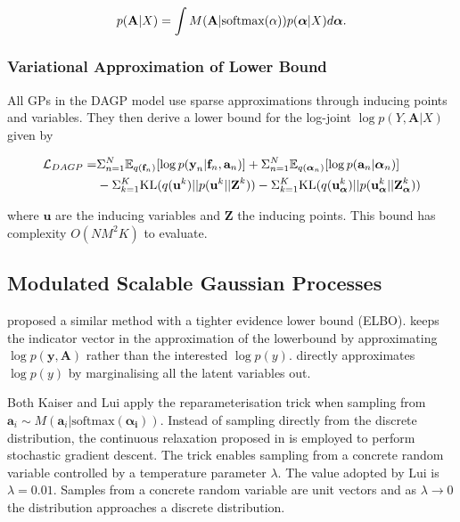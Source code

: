 \documentclass[12pt,a4paper]{report}
\theoremstyle{definition}
\begin{document}
\begin{equation}
	\centering 
	p(\textbf{A} | X) = \int M(\textbf{A} | \textrm{softmax}({\alpha})) p(\boldsymbol{\alpha} | X) d\boldsymbol{\alpha}.
\end{equation}

\subsubsection{Variational Approximation of Lower Bound}

All GPs in the DAGP model use sparse approximations through inducing points and variables.
They then derive a lower bound for the log-joint $\log p(Y, \textbf{A} | X)$ given by

\begin{equation}
	\begin{aligned}
		\centering
		\mathcal{L}_{DAGP} = &\Sigma_{n=1}^{N} \mathbb{E}_{q(\textbf{f}_{n})} [\log p(\textbf{y}_{n} | \textbf{f}_{n}, \textbf{a}_{n})]  + \Sigma_{n=1}^{N} \mathbb{E}_{q(\boldsymbol{\alpha}_{n})} [\log p(\textbf{a}_{n} | \boldsymbol{\alpha}_{n})]  \\
		&- \Sigma_{k=1}^{K} \textrm{KL}(q(\textbf{u}^k) || p(\textbf{u}^k || \textbf{Z}^k)) - \Sigma_{k=1}^{K} \textrm{KL}(q(\textbf{u}_{\boldsymbol{\alpha}}^k) || p(\textbf{u}_{\boldsymbol{\alpha}}^k || \textbf{Z}_{\boldsymbol{\alpha}}^k))
	\end{aligned}
\end{equation}

where $\textbf{u}$ are the inducing variables and $\textbf{Z}$ the inducing points.
This bound has complexity $O(NM^2K)$ to evaluate.

\subsection{Modulated Scalable Gaussian Processes}

\citet{Lui2020} proposed a similar method with a tighter evidence lower bound (ELBO).
\citet{Kaiser2018} keeps the indicator vector in the approximation of the lowerbound by approximating $\log p(\textbf{y}, \textbf{A})$ rather than the interested $\log p(y)$.
\citet{Lui2020} directly approximates $\log p(y)$ by marginalising all the latent variables out.

Both Kaiser and Lui apply the reparameterisation trick when sampling from $\textbf{a}_{i} \sim M(\textbf{a}_{i} | \textrm{softmax}(\boldsymbol{\alpha_{i}}))$. 
Instead of sampling directly from the discrete distribution, the continuous relaxation proposed in \citet{Maddison2017} is employed to perform stochastic gradient descent. 
The trick enables sampling from a concrete random variable controlled by a temperature parameter $\lambda$.
The value adopted by Lui is $\lambda = 0.01$.
Samples from a concrete random variable are unit vectors and as $\lambda \longrightarrow 0$ the distribution approaches a discrete distribution.
\end{document}
